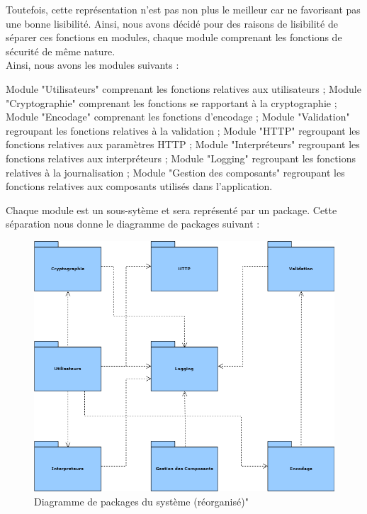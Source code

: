 Toutefois, cette représentation n'est pas non plus le meilleur car ne favorisant pas une bonne lisibilité. Ainsi, nous avons décidé pour des raisons de lisibilité de séparer ces fonctions en modules, chaque module comprenant les fonctions de sécurité de même nature.\\
Ainsi, nous avons les modules suivants :
\begin{itemize}
	\itemcheck Module "Utilisateurs" comprenant les fonctions relatives aux utilisateurs ;
	\itemcheck Module "Cryptographie" comprenant les fonctions se rapportant à la cryptographie ; 
	\itemcheck Module "Encodage" comprenant les fonctions d'encodage ; 
	\itemcheck Module "Validation" regroupant les fonctions relatives à la validation ; 
	\itemcheck Module "HTTP" regroupant les fonctions relatives aux paramètres HTTP ;
	\itemcheck Module "Interpréteurs" regroupant les fonctions relatives aux interpréteurs ;
	\itemcheck Module "Logging" regroupant les fonctions relatives à la journalisation ; 
	\itemcheck Module "Gestion des composants" regroupant les fonctions relatives aux composants utilisés dans l'application.
\end{itemize}
Chaque module est un sous-sytème et sera représenté par un package. Cette séparation nous donne le diagramme de packages suivant :
\begin{figure}[H]
	\centering
	\includegraphics[height=0.5\textheight]{fig/S-Package-diagram.png}
	\caption{Diagramme de packages du système (réorganisé)"}
\end{figure}


